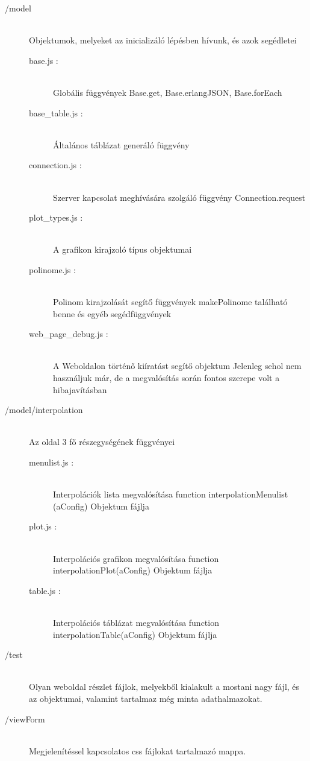 \begin{description}
		\item[/model] \hfill \\ 
		Objektumok, melyeket az inicializáló lépésben hívunk, és azok segédletei
		\begin{description}
		 	\item[base.js : ] \hfill \\
		 		Globális függvények \newline
		 		Base.get, Base.erlangJSON, Base.forEach
		 	\item[base\_table.js : ] \hfill \\
		 		Általános táblázat generáló függvény
		 	\item[connection.js : ] \hfill \\
		 		Szerver kapcsolat meghívására szolgáló függvény \newline
		 		Connection.request
		 	\item[plot\_types.js : ] \hfill \\
		 		A grafikon kirajzoló típus objektumai
		 	\item[polinome.js : ] \hfill \\  
		 		Polinom kirajzolását segítő függvények \newline
		 		makePolinome található benne és egyéb segédfüggvények
		 	\item[web\_page\_debug.js : ] \hfill \\ 
		 		A Weboldalon történő kiíratást segítő objektum \newline
		 		Jelenleg sehol nem használjuk már, de a megvalósítás során fontos szerepe volt a hibajavításban
		\end{description}
		\item[/model/interpolation] \hfill \\
			Az oldal 3 fő részegységének függvényei
			\begin{description}
			\item[menulist.js : ] \hfill \\ 
				Interpolációk lista megvalósítása \newline
				function interpolationMenulist (aConfig) Objektum fájlja
		  	\item[plot.js : ] \hfill \\ 
		  		Interpolációs grafikon megvalósítása \newline
				function interpolationPlot(aConfig) Objektum fájlja
			\item[table.js : ] \hfill \\
				Interpolációs táblázat megvalósítása \newline
				function interpolationTable(aConfig) Objektum fájlja
			\end{description}

		\item[/test] \hfill \\ 
			Olyan weboldal részlet fájlok, melyekből kialakult a mostani nagy fájl, és az objektumai, valamint tartalmaz még minta adathalmazokat.

		\item[/viewForm] \hfill \\ 
			Megjelenítéssel kapcsolatos css fájlokat tartalmazó mappa.
	\end{description}

